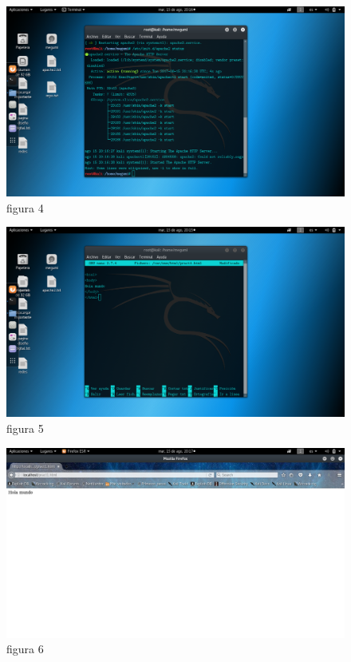 \documentclass[12pt,letterpaper]{article}
\begin{document}
\begin{center}
\begin{figure}[!ht]
\includegraphics[width=400pt]{./imgs/2.png}
\caption{figura 4}\label{figure 4}
\end{figure}

\begin{figure}[!ht]
\includegraphics[width=400pt]{./imgs/3.png}
\caption{figura 5}\label{figure 5}
\end{figure}

\begin{figure}[h]
\includegraphics[width=400pt]{./imgs/6.png}
\caption{figura 6}\label{figure 6}
\end{figure}
\end{center}
\end{document}
